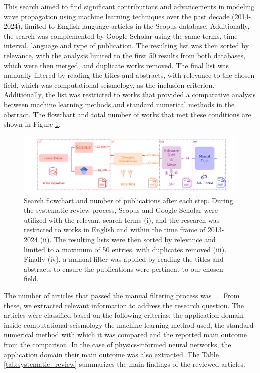 \documentclass[11pt,twoside]{article}
\begin{document}
This search aimed to find significant contributions and advancements in modeling wave propagation using machine
learning techniques over the past decade (2014-2024), limited to English language articles in the Scopus 
database. Additionally, the search was complemented by Google Scholar using the same terms, time interval, 
language and type of publication. The resulting list was then sorted by relevance, with the analysis limited 
to the first 50 results from both databases, which were then merged, and duplicate works removed. The final 
list was manually filtered by reading the titles and abstracts, with relevance to the chosen field, which was
computational seismology, as the inclusion criterion. Additionally, the list was restricted to works that 
provided a comparative analysis between machine learning methods and standard numerical methods in the 
abstract. The flowchart and total number of works that met these conditions are shown in 
Figure \ref{fig:scheme_systematic_review}.

\begin{figure}[h]
    \includegraphics[width=1.0\textwidth]{figs/scheme_systematic_review.pdf}
\caption{Search flowchart and number of publications after each step. During the systematic review process, 
Scopus and Google Scholar were utilized with the relevant search terms (i), and the research was restricted to works 
in English and within the time frame of 2013-2024 (ii). The resulting lists were then sorted by relevance and limited 
to a maximum of 50 entries, with duplicates removed (iii). Finally (iv), a manual filter was applied by reading the 
titles and abstracts to ensure the publications were pertinent to our chosen field.}\label{fig:scheme_systematic_review}
\end{figure}

The number of articles that passed the manual filtering process was \_. From these, we extracted relevant information to 
address the research question. The articles were classified based on the following criterias: the application domain 
inside computational seismology the machine learning method used, the standard numerical method with which it was 
compared and the reported main outcome from the comparison. In the case of physics-informed neural networks, 
the application domain their main outcome was also extracted. The Table \ref{tab:systematic_review} summarizes 
the main findings of the reviewed articles. 
\end{document}
